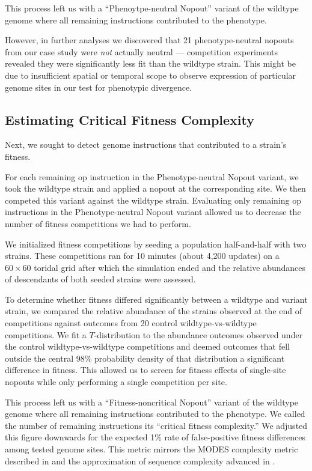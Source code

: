 This process left us with a ``Phenoytpe-neutral Nopout'' variant of the wildtype genome where all remaining instructions contributed to the phenotype.

However, in further analyses we discovered that 21 phenotype-neutral nopouts from our case study were \textit{not} actually neutral --- competition experiments revealed they were significantly less fit than the wildtype strain.
This might be due to insufficient spatial or temporal scope to observe expression of particular genome sites in our test for phenotypic divergence.

\subsection{Estimating Critical Fitness Complexity}

Next, we sought to detect genome instructions that contributed to a strain's fitness.

For each remaining op instruction in the Phenotype-neutral Nopout variant, we took the wildtype strain and applied a nopout at the corresponding site.
We then competed this variant against the wildtype strain.
Evaluating only remaining op instructions in the Phenotype-neutral Nopout variant allowed us to decrease the number of fitness competitions we had to perform.

We initialized fitness competitions by seeding a population half-and-half with two strains.
These competitions ran for 10 minutes (about 4,200 updates) on a $60\times60$ toridal grid after which the simulation ended and the relative abundances of descendants of both seeded strains were assessed.

To determine whether fitness differed significantly between a wildtype and variant strain, we compared the relative abundance of the strains observed at the end of competitions against outcomes from 20 control wildtype-vs-wildtype competitions.
We fit a $T$-distribution to the abundance outcomes observed under the control wildtype-vs-wildtype competitions and deemed outcomes that fell outside the central 98\% probability density of that distribution a significant difference in fitness.
This allowed us to screen for fitness effects of single-site nopouts while only performing a single competition per site.

This process left us with a ``Fitness-noncritical Nopout'' variant of the wildtype genome where all remaining instructions contributed to the phenotype.
We called the number of remaining instructions its ``critical fitness complexity.''
We adjusted this figure downwards for the expected 1\% rate of false-positive fitness differences among tested genome sites.
This metric mirrors the MODES complexity metric described in \citep{dolson2019modes} and the approximation of sequence complexity advanced in \citep{adami2000evolution}.

